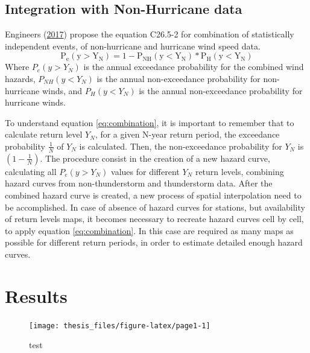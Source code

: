 \documentclass[12pt,oneside]{reedthesis}
\begin{document}
\hypertarget{integration-with-non-hurricane-data}{%
\section{Integration with Non-Hurricane data}\label{integration-with-non-hurricane-data}}

Engineers (\protect\hyperlink{ref-Asce2017}{2017}) propose the equation C26.5-2 for combination of statistically independent events, of non-hurricane and hurricane wind speed data.
\begin{equation}
  \mathrm{
          P_e(y>Y_N) = 1 - P_{NH}(y<Y_N)*P_{H}(y<Y_N)
        }
  \label{eq:combination}
\end{equation}
Where \(P_e(y>Y_N)\) is the annual exceedance probability for the combined wind hazards, \(P_{NH}(y<Y_N)\) is the annual non-exceedance probability for non-hurricane winds, and \(P_{H}(y<Y_N)\) is the annual non-exceedance probability for hurricane winds.

To understand equation \eqref{eq:combination}, it is important to remember that to calculate return level \(Y_N\), for a given N-year return period, the exceedance probability \(\frac{1}{N}\) of \(Y_N\) is calculated. Then, the non-exceedance probability for \(Y_N\) is \(\left(1-\frac{1}{N}\right)\). The procedure consist in the creation of a new hazard curve, calculating all \(P_e(y>Y_N)\) values for different \(Y_N\) return levels, combining hazard curves from non-thunderstorm and thunderstorm data.
After the combined hazard curve is created, a new process of spatial interpolation need to be accomplished. In case of absence of hazard curves for stations, but availability of return levels maps, it becomes necessary to recreate hazard curves cell by cell, to apply equation \eqref{eq:combination}. In this case are required as many maps as possible for different return periods, in order to estimate detailed enough hazard curves.

\hypertarget{rmd-results}{%
\chapter{Results}\label{rmd-results}}

\footnotesize
\begin{figure}

{\centering \texttt{[image: thesis\_files/figure-latex/page1-1]} 

}

\caption{test}\label{fig:page1}
\end{figure}
\normalsize
\end{document}
